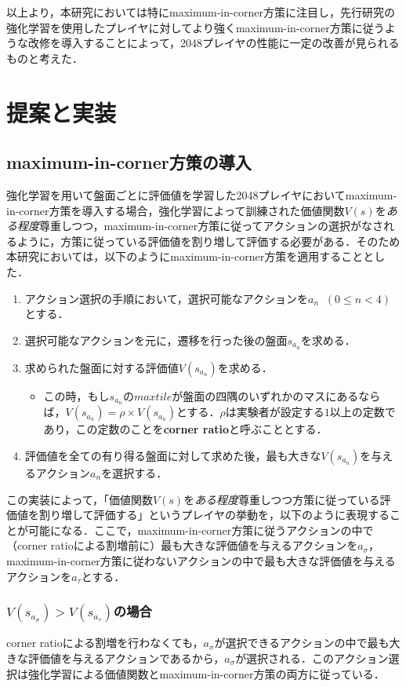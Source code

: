 \documentclass{suribt}
\begin{document}
以上より，本研究においては特にmaximum-in-corner方策に注目し，先行研究の強化学習を使用したプレイヤに対してより強くmaximum-in-corner方策に従うような改修を導入することによって，2048プレイヤの性能に一定の改善が見られるものと考えた．

\chapter{提案と実装}
\section{maximum-in-corner方策の導入}
強化学習を用いて盤面ごとに評価値を学習した2048プレイヤにおいてmaximum-in-corner方策を導入する場合，強化学習によって訓練された価値関数$V(s)$を\emph{ある程度}尊重しつつ，maximum-in-corner方策に従ってアクションの選択がなされるように，方策に従っている評価値を割り増して評価する必要がある．そのため本研究においては，以下のようにmaximum-in-corner方策を適用することとした．

\begin{enumerate}
\item アクション選択の手順において，選択可能なアクションを$a_n \;\; (0 \leq n < 4)$とする．
\item 選択可能なアクションを元に，遷移を行った後の盤面$s_{a_n}$を求める．
\item 求められた盤面に対する評価値$V(s_{a_n})$を求める．
\begin{itemize}
\item この時，もし$s_{a_n}$の$maxtile$が盤面の四隅のいずれかのマスにあるならば，$V(s_{a_n}) = {\rho} \times V(s_{a_n})$とする．${\rho}$は実験者が設定する$1$以上の定数であり，この定数のことを\textbf{corner ratio}と呼ぶこととする．
\end{itemize}
\item 評価値を全ての有り得る盤面に対して求めた後，最も大きな$V(s_{a_n})$を与えるアクション$a_n$を選択する．
\end{enumerate}

この実装によって，「価値関数$V(s)$を\emph{ある程度}尊重しつつ方策に従っている評価値を割り増して評価する」というプレイヤの挙動を，以下のように表現することが可能になる．ここで，maximum-in-corner方策に従うアクションの中で（corner ratioによる割増前に）最も大きな評価値を与えるアクションを$a_{\sigma}$，maximum-in-corner方策に従わないアクションの中で最も大きな評価値を与えるアクションを$a_{\tau}$とする．

\subsection{$V(s_{a_{\sigma}}) > V(s_{a_{\tau}})$の場合}
corner ratioによる割増を行わなくても，$a_{\sigma}$が選択できるアクションの中で最も大きな評価値を与えるアクションであるから，$a_{\sigma}$が選択される．このアクション選択は強化学習による価値関数とmaximum-in-corner方策の両方に従っている．
\end{document}
